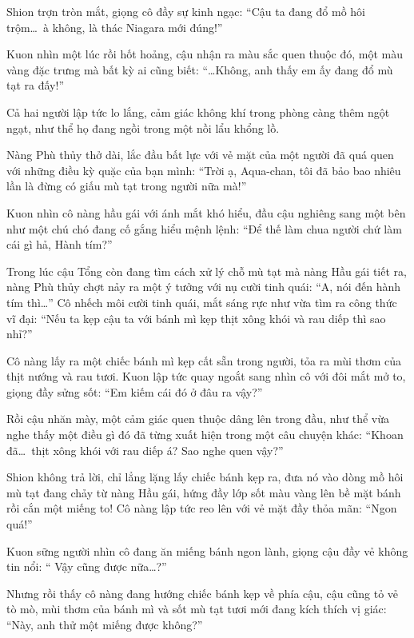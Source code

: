 \documentclass[../main.tex]{subfiles}
\begin{document}

Shion trợn tròn mắt, giọng cô đầy sự kinh ngạc: ``Cậu ta đang đổ mồ hôi trộm\dots\ à không, là thác Niagara mới đúng!''

Kuon nhìn một lúc rồi hốt hoảng, cậu nhận ra màu sắc quen thuộc đó, một màu vàng đặc trưng mà bất kỳ ai cũng biết: ``\dots Không, anh thấy em ấy đang đổ mù tạt ra đấy!''

Cả hai người lập tức lo lắng, cảm giác không khí trong phòng càng thêm ngột ngạt, như thể họ đang ngồi trong một nồi lẩu khổng lồ.

Nàng Phù thủy thở dài, lắc đầu bất lực với vẻ mặt của một người đã quá quen với những điều kỳ quặc của bạn mình: ``Trời ạ, Aqua-chan, tôi đã bảo bao nhiêu lần là đừng có giấu mù tạt trong người nữa mà!''

Kuon nhìn cô nàng hầu gái với ánh mắt khó hiểu, đầu cậu nghiêng sang một bên như một chú chó đang cố gắng hiểu mệnh lệnh: ``Để thế làm chua người chứ làm cái gì hả, Hành tím?''

Trong lúc cậu Tổng còn đang tìm cách xử lý chỗ mù tạt mà nàng Hầu gái tiết ra, nàng Phù thủy chợt nảy ra một ý tưởng với nụ cười tinh quái: ``A, nói đến hành tím thì\dots'' Cô nhếch môi cười tinh quái, mắt sáng rực như vừa tìm ra công thức vĩ đại: ``Nếu ta kẹp cậu ta với bánh mì kẹp thịt xông khói và rau diếp thì sao nhỉ?''

Cô nàng lấy ra một chiếc bánh mì kẹp cất sẵn trong người, tỏa ra mùi thơm của thịt nướng và rau tươi. Kuon lập tức quay ngoắt sang nhìn cô với đôi mắt mở to, giọng đầy sửng sốt: ``Em kiếm cái đó ở đâu ra vậy?''


Rồi cậu nhăn mày, một cảm giác quen thuộc dâng lên trong đầu, như thể vừa nghe thấy một điều gì đó đã từng xuất hiện trong một câu chuyện khác: ``Khoan đã\dots\ thịt xông khói với rau diếp á? Sao nghe quen vậy?''

Shion không trả lời, chỉ lẳng lặng lấy chiếc bánh kẹp ra, đưa nó vào dòng mồ hôi mù tạt đang chảy từ nàng Hầu gái, hứng đầy lớp sốt màu vàng lên bề mặt bánh rồi cắn một miếng to! Cô nàng lập tức reo lên với vẻ mặt đầy thỏa mãn: ``Ngon quá!''

Kuon sững người nhìn cô đang ăn miếng bánh ngon lành, giọng cậu đầy vẻ không tin nổi: `` Vậy cũng được nữa\dots?''

Nhưng rồi thấy cô nàng đang hướng chiếc bánh kẹp về phía cậu, cậu cũng tỏ vẻ tò mò, mùi thơm của bánh mì và sốt mù tạt tươi mới đang kích thích vị giác: ``Này, anh thử một miếng được không?''
\end{document}
